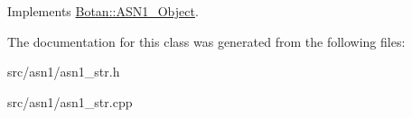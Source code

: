 Implements \hyperlink{classBotan_1_1ASN1__Object_a05db1180efe5c3acc30266d0032823ea}{Botan\-::\-A\-S\-N1\-\_\-\-Object}.



The documentation for this class was generated from the following files\-:\begin{DoxyCompactItemize}
\item 
src/asn1/asn1\-\_\-str.\-h\item 
src/asn1/asn1\-\_\-str.\-cpp\end{DoxyCompactItemize}
